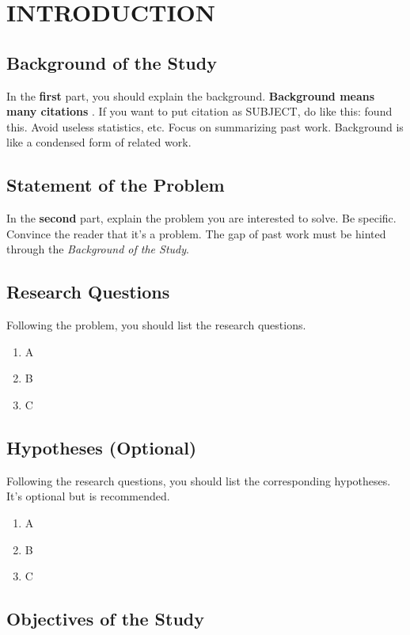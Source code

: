 \chapter{INTRODUCTION} 

\section{Background of the Study}
In the \textbf{first} part, you should explain the background.   \textbf{Background means many citations} \citep{vaswani2017attention, ho2020denoising}.  If you want to put citation as SUBJECT, do like this:  \cite{vaswani2017attention} found this.   Avoid useless statistics, etc.  Focus on summarizing past work.   Background is like a condensed form of related work.

\section{Statement of the Problem}
In the \textbf{second} part, explain the problem you are interested to solve.  Be specific.  Convince the reader that it's a problem.  The gap of past work must be hinted through the \textit{Background of the Study}. 

\section{Research Questions}
Following the problem, you should list the research questions.
\begin{enumerate}
    \item A
    \item B
    \item C
\end{enumerate}

\section{Hypotheses (Optional)}
Following the research questions, you should list the corresponding hypotheses.  It's optional but is recommended.
\begin{enumerate}
    \item A
    \item B
    \item C
\end{enumerate}

\section{Objectives of the Study}

